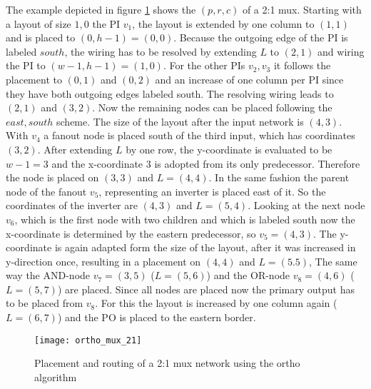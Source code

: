 The example depicted in figure \ref{fig:ortho_mux_21} shows the $(p, r, c)$ of a 2:1 mux. Starting with a layout of size $1, 0$ the PI $v_1$, the layout is extended by one column to $(1, 1)$ and is placed to $(0, h-1) = (0, 0)$. Because the outgoing edge of the PI is labeled $south$, the wiring has to be resolved by extending $L$ to $(2, 1)$ and wiring the PI to $(w-1, h-1)=(1, 0)$. For the other PIs $v_2, v_3$ it follows the placement to $(0, 1)$ and $(0, 2)$ and an increase of one column per PI since they have both outgoing edges labeled south. The resolving wiring leads to $(2, 1)$ and $(3, 2)$. Now the remaining nodes can be placed following the $east, south$ scheme. The size of the layout after the input network is $(4, 3)$. With $v_4$ a fanout node is placed south of the third input, which has coordinates $(3, 2)$. After extending $L$ by one row, the y-coordinate is evaluated to be $w-1 = 3$ and the x-coordinate $3$ is adopted from its only predecessor. Therefore the node is placed on $(3, 3)$ and $L=(4, 4)$. In the same fashion the parent node of the fanout $v_5$, representing an inverter is placed east of it. So the coordinates of the inverter are $(4, 3)$ and $L = (5, 4)$. Looking at the next node $v_6$, which is the first node with two children and which is labeled south now the x-coordinate is determined by the eastern predecessor, so $v_5 = (4, 3)$. The y-coordinate is again adapted form the size of the layout, after it was increased in y-direction once, resulting in a placement on $(4, 4)$ and $L = (5. 5)$, The same way the AND-node $v_7 = (3, 5)$ ($L = (5, 6)$) and the OR-node $v_8 = (4, 6)$ ($L = (5, 7)$) are placed. Since all nodes are placed now the primary output has to be placed from $v_8$. For this the layout is increased by one column again ($L = (6, 7)$) and the PO is placed to the eastern border.\\

\begin{figure}
	\centering
	\texttt{[image: ortho\_mux\_21]}
	\caption{Placement and routing of a 2:1 mux network using the ortho algorithm}\label{fig:ortho_mux_21}
\end{figure}

